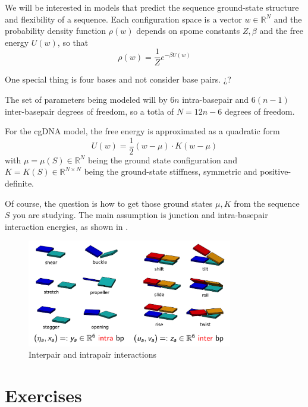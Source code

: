 \documentclass[palatino]{epflnotes}
\begin{document}
We will be interested in models that predict the sequence ground-state structure and flexibility of a sequence. Each configuration space is a vector $w ∈ ℝ^N$ and the probability density function $ρ(w)$ depends on spome constants $Z,β$ and the free energy $U(w)$, so that \[ ρ(w) = \frac{1}{Z} e^{-βU(w)} \]

One special thing is four bases and not consider base pairs. ¿?

The set of parameters being modeled will by $6n$ intra-basepair and $6(n-1)$ inter-basepair degrees of freedom, so a totla of $N = 12n - 6$ degrees of freedom.

For the cgDNA model, the free energy is approximated as a quadratic form \[ U(w)= \frac{1}{2} (w - μ) · K(w -μ)\] with $μ = μ(S) ∈ ℝ^N$ being the ground state configuration and $K = K(S) ∈ ℝ^{N×N}$ being the ground-state stiffness, symmetric and positive-definite.

Of course, the question is how to get those ground states $μ, K$ from the sequence $S$ you are studying. The main assumption is junction and intra-basepair interaction energies, as shown in .

\begin{figure}[tbp]
\centering
\includegraphics[width=0.8\textwidth]{img/movementsDNA.png}
\caption{Interpair and intrapair interactions}
\label{fig:MovementsDNA}
\end{figure}

\appendix

\chapter{Exercises}

\backmatter
\printindex
\end{document}
